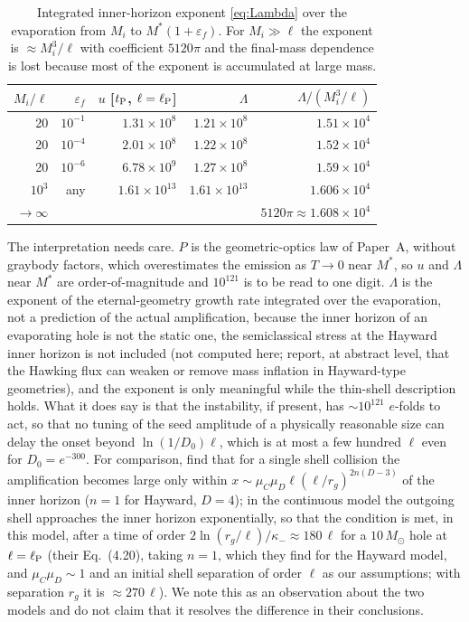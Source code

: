 \documentclass[11pt]{article}
\newcommand{\Msun}{M_\odot}
\begin{document}
\begin{table}[t]
\centering\small
\begin{tabular}{rrrrr}
\toprule
$M_i/\ell$ & $\varepsilon_f$ & $u$ [$t_{\rm P}$, $\ell=\ell_{\rm P}$] & $\Lambda$ & $\Lambda/(M_i^3/\ell)$\\
\midrule
20 & $10^{-1}$ & $1.31\times10^{8}$ & $1.21\times10^{8}$ & $1.51\times10^{4}$\\
20 & $10^{-4}$ & $2.01\times10^{8}$ & $1.22\times10^{8}$ & $1.52\times10^{4}$\\
20 & $10^{-6}$ & $6.78\times10^{9}$ & $1.27\times10^{8}$ & $1.59\times10^{4}$\\
$10^{3}$ & any & $1.61\times10^{13}$ & $1.61\times10^{13}$ & $1.606\times10^{4}$\\
$\to\infty$ & & & & $5120\pi\approx1.608\times10^{4}$\\
\bottomrule
\end{tabular}
\caption{Integrated inner-horizon exponent \eqref{eq:Lambda} over the evaporation from $M_i$ to $M^*(1+\varepsilon_f)$. For $M_i\gg\ell$ the exponent is $\approx M_i^3/\ell$ with coefficient $5120\pi$ and the final-mass dependence is lost because most of the exponent is accumulated at large mass.}
\label{tab:evap}
\end{table}

The interpretation needs care. $P$ is the geometric-optics law of Paper~A, without graybody factors, which overestimates the emission as $T\to0$ near $M^*$, so $u$ and $\Lambda$ near $M^*$ are order-of-magnitude and $10^{121}$ is to be read to one digit. $\Lambda$ is the exponent of the eternal-geometry growth rate integrated over the evaporation, not a prediction of the actual amplification, because the inner horizon of an evaporating hole is not the static one, the semiclassical stress at the Hayward inner horizon is not included (not computed here; \citet{Bonanno2023} report, at abstract level, that the Hawking flux can weaken or remove mass inflation in Hayward-type geometries), and the exponent is only meaningful while the thin-shell description holds. What it does say is that the instability, if present, has $\sim10^{121}$ $e$-folds to act, so that no tuning of the seed amplitude of a physically reasonable size can delay the onset beyond $\ln(1/D_0)\ell$, which is at most a few hundred $\ell$ even for $D_0=e^{-300}$. For comparison, \citet{FrolovZelnikov2026} find that for a single shell collision the amplification becomes large only within $x\sim\mu_C\mu_D\ell(\ell/r_g)^{2n(D-3)}$ of the inner horizon ($n=1$ for Hayward, $D=4$); in the continuous model the outgoing shell approaches the inner horizon exponentially, so that the condition is met, in this model, after a time of order $2\ln(r_g/\ell)/\kappa_-\approx180\,\ell$ for a $10\,\Msun$ hole at $\ell=\ell_{\rm P}$ (their Eq.~(4.20), taking $n=1$, which they find for the Hayward model, and $\mu_C\mu_D\sim1$ and an initial shell separation of order $\ell$ as our assumptions; with separation $r_g$ it is $\approx270\,\ell$). We note this as an observation about the two models and do not claim that it resolves the difference in their conclusions.
\end{document}
